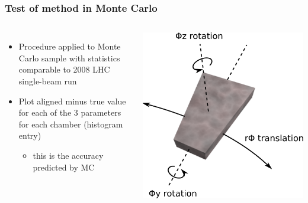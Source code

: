\documentclass[compress]{beamer}
\begin{document}
\begin{frame}
\frametitle{Test of method in Monte Carlo}

\begin{columns}
\begin{itemize}
\item Procedure applied to Monte Carlo sample with statistics comparable to 2008 LHC single-beam run
\item Plot aligned minus true value for each of the 3 parameters for each chamber (histogram entry)
\begin{itemize}
\item this is the accuracy predicted by MC
\end{itemize}
\end{itemize}

\includegraphics[width=\linewidth]{csc_coordinates.pdf}
\end{columns}


\end{frame}
\end{document}
